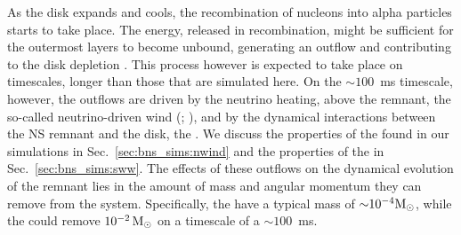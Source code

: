 As the disk expands and cools, the recombination of nucleons into alpha particles 
starts to take place. The energy, released in recombination, might be sufficient 
for the outermost layers to become unbound, generating an outflow and contributing 
to the disk depletion \citep{Beloborodov:2008nx,Lee:2009uc,Fernandez:2013tya}.
%
This process however is expected to take place on timescales, longer than
those that are simulated here. On the $\sim100$~ms timescale, however, the outflows 
are driven by the neutrino heating, above the remnant, the so-called neutrino-driven 
wind (\nwind; \citep{Dessart:2008zd,Perego:2014fma,Just:2014fka}), and by the dynamical 
interactions between the \ac{NS} remnant and the disk, the \swind{} \citep{Nedora:2019jhl}.
%
We discuss the properties of the \nwind{} found in our simulations
in Sec.~\ref{sec:bns_sims:nwind} and the properties of the 
\swind{} in Sec.~\ref{sec:bns_sims:sww}.
The effects of these outflows on the dynamical evolution of the remnant 
lies in the amount of mass and angular momentum they can remove from the system.
%
Specifically, the \nwind{} have a typical mass of ${\sim} 10^{-4}{\text{M}_{\odot}}$, 
while the \swind{} could remove $10^{-2}\,{\text{M}_{\odot}}$ on a timescale of a $\sim100$~ms.

